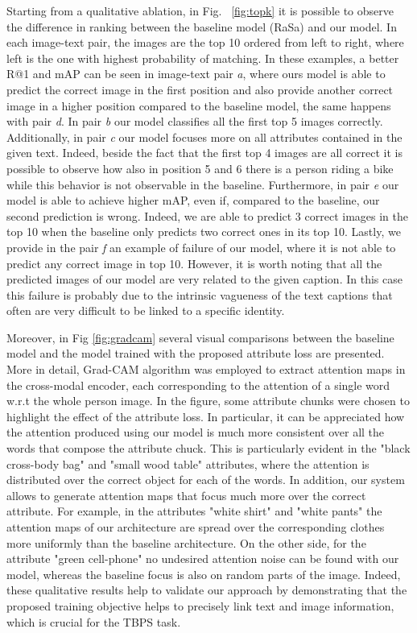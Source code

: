 \documentclass[acmsmall]{acmart}
\begin{document}
Starting from a qualitative ablation, in Fig. ~\ref{fig:topk} it is possible to observe the difference in ranking between the baseline model (RaSa) and our model. In each image-text pair, the images are the top 10 ordered from left to right, where left is the one with highest probability of matching. In these examples, a better R@1 and mAP can be seen in image-text pair \textit{a}, where ours model is able to predict the correct image in the first position and also provide another correct image in a higher position compared to the baseline model, the same happens with pair \textit{d}. In pair \textit{b} our model classifies all the first top 5 images correctly. Additionally, in pair \textit{c} our model focuses more on all attributes contained in the given text. Indeed, beside the fact that the first top 4 images are all correct it is possible to observe how also in position 5 and 6 there is a person riding a bike while this behavior is not observable in the baseline. Furthermore, in pair \textit{e} our model is able to achieve higher mAP, even if, compared to the baseline, our second prediction is wrong. Indeed, we are able to predict 3 correct images in the top 10 when the baseline only predicts two correct ones in its top 10. Lastly, we provide in the pair \textit{f} an example of failure of our model, where it is not able to predict any correct image in top 10. However, it is worth noting that all the predicted images of our model are very related to the given caption. In this case this failure is probably due to the intrinsic vagueness of the text captions that often are very difficult to be linked to a specific identity.

Moreover, in Fig \ref{fig:gradcam} several visual comparisons between the baseline model and the model trained with the proposed attribute loss are presented. More in detail, Grad-CAM algorithm \cite{selvaraju2017grad} was employed to extract attention maps in the cross-modal encoder, each corresponding to the attention of a single word w.r.t the whole person image. In the figure, some attribute chunks were chosen to highlight the effect of the attribute loss. In particular, it can be appreciated how the attention produced using our model is much more consistent over all the words that compose the attribute chuck. This is particularly evident in the "black cross-body bag" and "small wood table" attributes, where the attention is distributed over the correct object for each of the words. In addition, our system allows to generate attention maps that focus much more over the correct attribute. For example, in the attributes "white shirt" and "white pants" the attention maps of our architecture are spread over the corresponding clothes more uniformly than the baseline architecture. On the other side, for the attribute "green cell-phone" no undesired attention noise can be found with our model, whereas the baseline focus is also on random parts of the image. Indeed, these qualitative results help to validate our approach by demonstrating that the proposed training objective helps to precisely link text and image information, which is crucial for the TBPS task.
\end{document}

